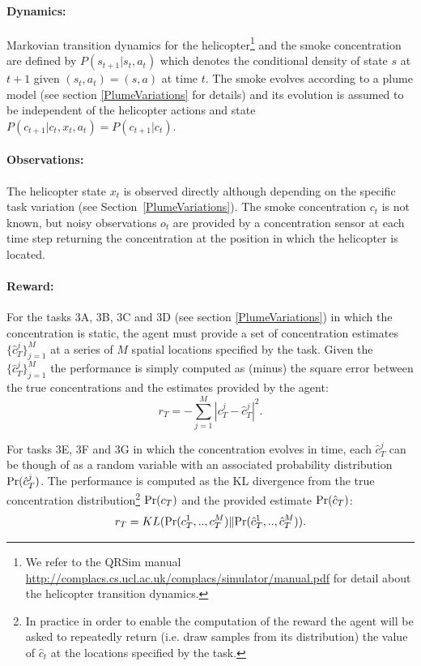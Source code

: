 \documentclass[a4paper,11pt]{report}
\newcommand{\sname}{QRSim\xspace}
\newcommand{\webman}{\url{http://complacs.cs.ucl.ac.uk/complacs/simulator/manual.pdf}\xspace}
\newcommand{\pr}{{\rm Pr}}
\begin{document}
\paragraph{Dynamics:} Markovian transition dynamics for the helicopter\footnote{We refer to the \sname manual \webman for detail about the helicopter transition dynamics.} and the smoke concentration are defined by $P(s_{t+1}|s_t,a_t)$ which denotes the conditional density of state $s$ at $t+1$ given $(s_t,a_t) = (s,a)$ at time $t$. The smoke evolves according to a plume model (see section \ref{PlumeVariations} for details) and its evolution is assumed to be independent of the helicopter actions and state  $P(c_{t+1}|c_t,x_t,a_t)=P(c_{t+1}|c_t)$.

\paragraph{Observations:} The helicopter state $x_t$ is observed directly although depending on the specific task variation (see Section~\ref{PlumeVariations}). 
The smoke concentration $c_t$ is not known, but noisy observations $o_t$ are provided by a concentration sensor at each time step returning the concentration at the position in which the helicopter is located.

\paragraph{Reward:} 
For the tasks 3A, 3B, 3C and 3D (see section \ref{PlumeVariations}) in which the concentration is static, the agent must provide a set of concentration estimates $\{\hat c^j_T\}^M_{j=1}$ at a series of $M$ spatial locations specified by the task. 
Given the $\{\hat c^j_T\}^M_{j=1}$ the performance is simply computed as (minus) the square error between the true concentrations and the estimates provided by the agent:
$$
r_T = - \sum^M_{j=1} | c^j_T - \hat{c}^j_T |^2 .
$$

For tasks 3E, 3F and 3G in which the concentration evolves in time, each $\hat c^j_T$ can be though of as a random variable with an associated probability distribution $\pr(\hat c^j_T)$.
The performance is computed as the KL divergence from the true concentration distribution\footnote{In practice in order to enable the computation of the reward the agent will be asked to repeatedly return (i.e. draw samples from its distribution) the value of $\hat c_t$ at the locations specified by the task.} $\pr(c_T)$ and the provided estimate $\pr(\hat c_T)$:
$$
r_T = KL(\pr(c^1_T,..,c^M_T) \|{\pr}(\hat c^1_T,..,\hat c^M_T)).
$$
\end{document}
